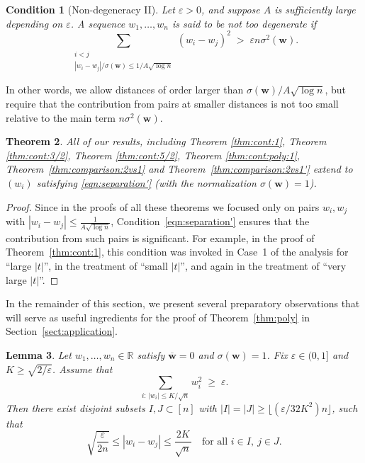 \documentclass[reqno]{amsart}
\newcommand\R{{\mathbb{R}}}
\newcommand\eps{{\varepsilon}}
\newcommand\BMw{{\bm w}}
\theoremstyle{plain}
\newtheorem{theorem}{Theorem}[section]
\newtheorem{lemma}[theorem]{Lemma}
\newtheorem{condition}[theorem]{Condition}
\theoremstyle{definition}
\begin{document}
\begin{condition}[Non-degeneracy II]\label{cond:separation'} 
Let $\eps>0$, and suppose $A$ is sufficiently large depending on $\eps$.  
A sequence $w_{1},\dots, w_{n}$ is said to be {not too degenerate} if
\begin{equation}\label{eqn:separation'}
\sum_{\substack{i<j \\ |w_i - w_j|/\sigma(\BMw) \le 1/A \sqrt{\log n}}} (w_{i} - w_{j})^{2} \;>\; \eps n \sigma^2(\BMw).
\end{equation}
\end{condition}
In other words, we allow distances of order larger than $\sigma(\BMw)/A\sqrt{\log n}$, but require that the contribution from pairs at smaller distances is not too small relative to the main term $n \sigma^2(\BMw)$.


\begin{theorem}\label{thm:general'} 
All of our results, including Theorem \ref{thm:cont:1}, Theorem \ref{thm:cont:3/2}, Theorem \ref{thm:cont:5/2}, Theorem \ref{thm:cont:poly:1}, Theorem~\ref{thm:comparison:2vs1} and Theorem~\ref{thm:comparison:2vs1'}  extend to $(w_{i})$ satisfying \eqref{eqn:separation'} (with the normalization $\sigma(\BMw)=1$).
\end{theorem}
\begin{proof} Since in the proofs of all these theorems we focused only on pairs $w_i, w_j$ with 
$|w_i - w_j| \le \tfrac{1}{A \sqrt{\log n}}$, 
Condition~\eqref{eqn:separation'} ensures that the contribution from such pairs is significant. 
For example, in the proof of Theorem~\ref{thm:cont:1}, this condition was invoked in Case~1 of the analysis for ``large $|t|$'', in the treatment of ``small $|t|$'', and again in the treatment of ``very large $|t|$''.
\end{proof}


In the remainder of this section, we present several preparatory observations that will serve as useful ingredients for the proof of Theorem~\ref{thm:poly} in Section~\ref{sect:application}.



\begin{lemma}\label{lemma:mass}
Let $w_1,\dots,w_n \in \R$ satisfy $\overline{\BMw}=0$ and $\sigma(\BMw)=1$.  
Fix $\eps \in (0,1]$ and $K \ge \sqrt{2/\eps}$. 
Assume that
\[
\sum_{i: \, |w_i| \le K/\sqrt{n}} w_i^2 \;\ge\; \eps.
\]
Then there exist disjoint subsets $I, J \subset [n]$ with $|I| = |J| \ge \big\lfloor (\eps/32K^2)n \big\rfloor$,
such that 
\[
\sqrt{\frac{\eps}{2n}}\le |w_i - w_j| \le \frac{2K}{\sqrt{n}} 
\quad \text{for all } i \in I, \ j \in J.
\]
\end{lemma}
\end{document}
